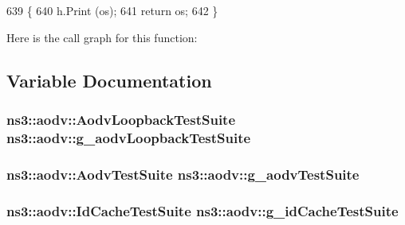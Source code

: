\begin{DoxyCode}
639 \{
640   h.Print (os);
641   \textcolor{keywordflow}{return} os;
642 \}
\end{DoxyCode}


Here is the call graph for this function\+:




\subsection{Variable Documentation}
\subsubsection[{\texorpdfstring{g\+\_\+aodv\+Loopback\+Test\+Suite}{g_aodvLoopbackTestSuite}}]{\setlength{\rightskip}{0pt plus 5cm} {\bf ns3\+::aodv\+::\+Aodv\+Loopback\+Test\+Suite}  ns3\+::aodv\+::g\+\_\+aodv\+Loopback\+Test\+Suite}\hypertarget{namespacens3_1_1aodv_a945eef28c158adb2600e316bef34575d}{}\label{namespacens3_1_1aodv_a945eef28c158adb2600e316bef34575d}
\subsubsection[{\texorpdfstring{g\+\_\+aodv\+Test\+Suite}{g_aodvTestSuite}}]{\setlength{\rightskip}{0pt plus 5cm} {\bf ns3\+::aodv\+::\+Aodv\+Test\+Suite}  ns3\+::aodv\+::g\+\_\+aodv\+Test\+Suite}\hypertarget{namespacens3_1_1aodv_a6bdcb01d640e6db83a090372c96ed015}{}\label{namespacens3_1_1aodv_a6bdcb01d640e6db83a090372c96ed015}
\subsubsection[{\texorpdfstring{g\+\_\+id\+Cache\+Test\+Suite}{g_idCacheTestSuite}}]{\setlength{\rightskip}{0pt plus 5cm} {\bf ns3\+::aodv\+::\+Id\+Cache\+Test\+Suite}  ns3\+::aodv\+::g\+\_\+id\+Cache\+Test\+Suite}\hypertarget{namespacens3_1_1aodv_aa474c1e6eccbc40ab8cb7b3eb4522b0c}{}\label{namespacens3_1_1aodv_aa474c1e6eccbc40ab8cb7b3eb4522b0c}
